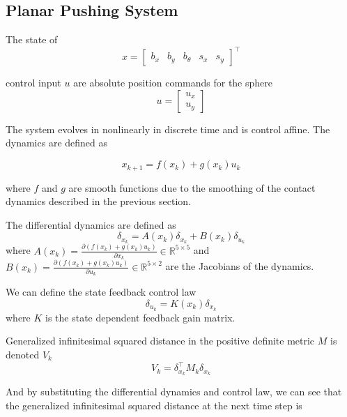 \documentclass[conference]{IEEEtran}
\begin{document}
\subsection{Planar Pushing System}
The state of 
\begin{equation}
    x = \begin{bmatrix}b_x & b_y & b_{\theta}& s_x& s_y\end{bmatrix}^\top
\end{equation}

control input $u$ are absolute position commands for the sphere
\begin{equation}
    u = \begin{bmatrix}u_x\\ u_y \end{bmatrix}
\end{equation}

The system evolves in nonlinearly in discrete time and is control affine. The dynamics are defined as

\begin{equation}
    x_{k+1} = f(x_k) + g(x_k)u_k
\end{equation}

where $f$ and $g$ are smooth functions due to the smoothing of the contact dynamics described in the previous section.

The differential dynamics are defined as
\begin{equation}
    \delta_{x_k} = A(x_k)\delta_{x_k} + B(x_k)\delta_{u_k}
\end{equation}
where $A(x_k) = \frac{\partial (f(x_k) + g(x_k)u_k)}{\partial x_k} \in \mathbb{R}^{5 \times 5}$ and $B(x_k) = \frac{\partial (f(x_k) + g(x_k)u_k)}{\partial u_k} \in \mathbb{R}^{5 \times 2}$ are the Jacobians of the dynamics.

We can define the state feedback control law
\begin{equation}
	\label{eq:delta_control_law}
    \delta_{u_k} = K(x_k)\delta_{x_k}
\end{equation}
where $K$ is the state dependent feedback gain matrix.

Generalized infinitesimal squared distance in the positive definite metric $M$ is denoted $V_k$
\begin{equation}
    V_k = \delta^\top_{x_k} M_{k} \delta_{x_k}
\end{equation}

And by substituting the differential dynamics and control law, we can see that the generalized infinitesimal squared distance at the next time step is
\end{document}
